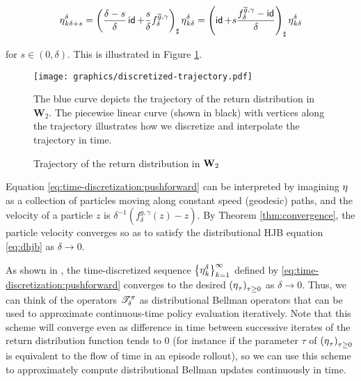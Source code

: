 \begin{equation}
  \label{eq:time-discretization:pushforward}
  \operatorname{\eta}^{\delta}_{k\delta + s} = {\left(\frac{\delta -
        s}{\delta}\operatorname{\mathsf{id}} +
      \frac{s}{\delta}f^{\overline{g},\gamma}_\delta\right)}_\sharp \operatorname{\eta}^\delta_{k\delta}
  = {\left(\operatorname{\mathsf{id}} + s\frac{f^{\overline{g}, \gamma}_\delta -
  \operatorname{\mathsf{id}}}{\delta}\right)}_\sharp \operatorname{\eta}^{\delta}_{k\delta}
\end{equation}

for $s\in(0,\delta)$. This is illustrated in Figure \ref{fig:spacetime}.

\begin{figure}[h]
  \centering
  \vspace{-1.5cm}
  \texttt{[image: graphics/discretized-trajectory.pdf]}
  \vspace{-1.5cm}
  \caption{Trajectory of the return distribution in
    $\mathbf{W}_{2}$}\label{fig:spacetime}
  \footnotesize
  The blue curve depicts the trajectory of the return distribution in
  $\mathbf{W}_2$. The piecewise linear curve (shown in black) with
  vertices along the trajectory illustrates how we discretize and
  interpolate the trajectory in time.
\end{figure}

Equation \eqref{eq:time-discretization:pushforward} can be interpreted
by imagining $\operatorname{\eta}$ as a collection of particles moving
along constant speed (geodesic) paths, and the velocity of a
particle $z$ is $\delta^{-1}(f_\delta^{\overline{g},\gamma}(z) -
z)$. By Theorem \ref{thm:convergence}, the particle velocity converges
so as to satisfy the distributional HJB equation
\eqref{eq:dhjb} as $\delta\to 0$.

As shown in \citet{Jordan02thevariational}, the time-discretized sequence
$\left\{\operatorname{\eta}^\delta_{k}\right\}_{k=1}^{\infty}$ defined by
\eqref{eq:time-discretization:pushforward} converges to the desired
$\left(\operatorname{\eta}_{\tau}\right)_{\tau \geq 0}$ as $\delta\to 0$. Thus, we can think of
the operators $\mathscr{T}^{\pi}_\delta$ as distributional Bellman operators that
can be used to approximate continuous-time policy evaluation iteratively. Note
that this scheme will converge even as difference in time between successive
iterates of the return distribution function tends to $0$ (for instance if the
parameter $\tau$ of $\left(\operatorname{\eta}_{\tau}\right)_{\tau \geq 0}$ is equivalent to the
flow of time in an episode rollout), so we can use this
scheme to approximately compute distributional Bellman updates continuously in time.

